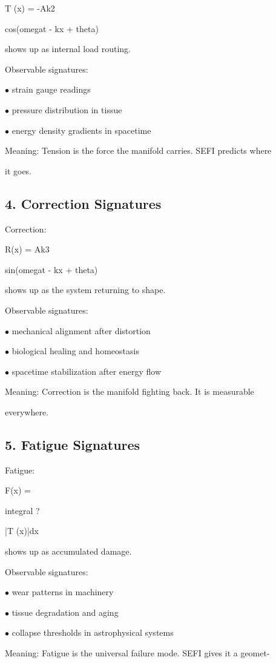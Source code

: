 \documentclass[10pt]{article}
\begin{document}
T (x) = -Ak2

cos(omegat - kx + theta)

shows up as internal load routing.

Observable signatures:

\noindent $\bullet$ strain gauge readings

\noindent $\bullet$ pressure distribution in tissue

\noindent $\bullet$ energy density gradients in spacetime

Meaning: Tension is the force the manifold carries. SEFI predicts where

it goes.

\subsection*{4. Correction Signatures}
Correction:

R(x) = Ak3

sin(omegat - kx + theta)

shows up as the system returning to shape.

Observable signatures:

\noindent $\bullet$ mechanical alignment after distortion

\noindent $\bullet$ biological healing and homeostasis

\noindent $\bullet$ spacetime stabilization after energy flow

Meaning: Correction is the manifold fighting back. It is measurable

everywhere.


\subsection*{5. Fatigue Signatures}
Fatigue:

F(x) =

integral ?

|T (x)|dx

shows up as accumulated damage.

Observable signatures:

\noindent $\bullet$ wear patterns in machinery

\noindent $\bullet$ tissue degradation and aging

\noindent $\bullet$ collapse thresholds in astrophysical systems

Meaning: Fatigue is the universal failure mode. SEFI gives it a geomet-
\end{document}
